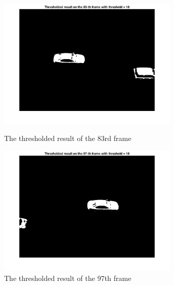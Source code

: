 \documentclass[a4paper]{article}
\begin{document}
\begin{spacing}{2.0}
\begin{enumerate}
	\begin{figure}[H]
	    \begin{minipage}[t]{0.5\textwidth}
	        \centering
	        \includegraphics[width=3.4in]{2_7.jpg}
	        \caption{The thresholded result of the 83rd frame}
	        \label{fig:side:a}
	    \end{minipage}%
	  \begin{minipage}[t]{0.5\textwidth}
	      \centering
	      \includegraphics[width=3.4in]{2_8.jpg}
	      \caption{The thresholded result of the 97th frame}
	      \label{fig:side:b}
	    \end{minipage}
	\end{figure}
	

\end{enumerate}
\end{spacing}
\end{document}

